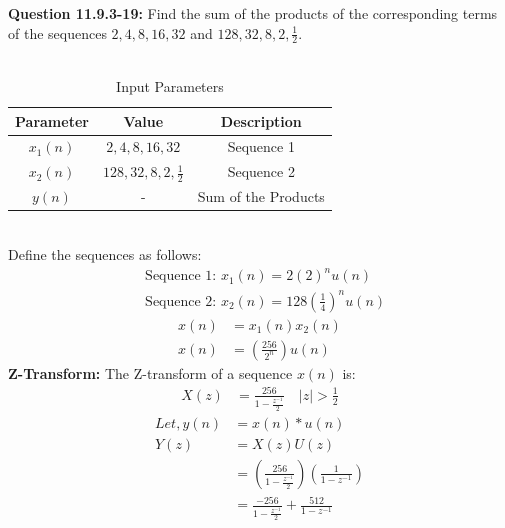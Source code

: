 \documentclass[journal,12pt,twocolumn]{IEEEtran}
\theoremstyle{remark}
\begin{document}
\title{}
\author{Sasa Mardi, EE23BTECH11222}
\date{}
\maketitle
\textbf{Question 11.9.3-19:} Find the sum of the products of the corresponding terms of the sequences $2, 4, 8, 16, 32$ and $128, 32, 8, 2, \frac{1}{2}$.\\
\\
\solution
\begin{table}[h!]
    \centering
    \caption{Input Parameters}
    \label{tab:1}
    \begin{tabular}{ | c | c | c | }
        \hline
        Parameter & Value & Description \\
        \hline
        $x_1(n)$ & $2, 4, 8, 16, 32$ &  Sequence 1 \\
        \hline
        $x_2(n)$ & $128, 32, 8, 2, \frac{1}{2}$ &  Sequence 2 \\
        \hline
        $y(n)$ & - &  Sum of the Products \\
        \hline
    \end{tabular}
\end{table}\\
Define the sequences as follows:\\
\begin{align}
&\text{Sequence 1: } x_1(n) = 2(2)^nu(n) \\
&\text{Sequence 2: } x_2(n) = 128\left(\frac{1}{4}\right)^nu(n)
\end{align}
\begin{align}
x(n) &= x_1(n)x_2(n) \\
x(n) &= \left(\frac{256}{2^{n}}\right)u(n)
\end{align}
\textbf{Z-Transform:}
The Z-transform of a sequence \( x(n) \) is:
\begin{align}
X(z) &= \frac{256}{1 - \frac{z^{-1}}{2}}    \quad |z| > \frac{1}{2}
\end{align}
\begin{align}
Let, y(n) &= x(n)*u(n) \\
 Y(z) &= X(z)U(z) \\
 &= \left(\frac{256}{1 - \frac{z^{-1}}{2}}\right)\left(\frac{1}{1 - z^{-1}}\right)\\
 &= \frac{-256}{1 - \frac{z^{-1}}{2}} + \frac{512}{1 - z^{-1}}
\end{align}
\end{document}
